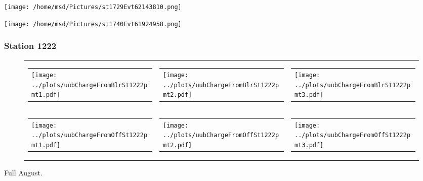 \documentclass[aspectratio=169]{beamer}
\begin{document}
\begin{frame}
  \begin{center}
    \texttt{[image: /home/msd/Pictures/st1729Evt62143810.png]}
  \end{center}
\end{frame}

\begin{frame}
  \begin{center}
    \texttt{[image: /home/msd/Pictures/st1740Evt61924958.png]}
  \end{center}
\end{frame}

\begin{frame} 
  \frametitle{Station 1222}
 
  \begin{figure}
    \centering
    \begin{tabularx}{\textwidth}{LCR}
      \begin{tabular}{l}
        \texttt{[image: ../plots/uubChargeFromBlrSt1222pmt1.pdf]}
      \end{tabular}
      &
      \begin{tabular}{l}
        \texttt{[image: ../plots/uubChargeFromBlrSt1222pmt2.pdf]}
      \end{tabular}
      &
      \begin{tabular}{l}
        \texttt{[image: ../plots/uubChargeFromBlrSt1222pmt3.pdf]}
      \end{tabular}
      \\
      \begin{tabular}{l}
        \texttt{[image: ../plots/uubChargeFromOffSt1222pmt1.pdf]}
      \end{tabular}
      &
      \begin{tabular}{l}
        \texttt{[image: ../plots/uubChargeFromOffSt1222pmt2.pdf]}
      \end{tabular}
      &
      \begin{tabular}{l}
        \texttt{[image: ../plots/uubChargeFromOffSt1222pmt3.pdf]}
      \end{tabular}
    \end{tabularx}
  \end{figure}
  Full August. 
\end{frame}
\end{document}
